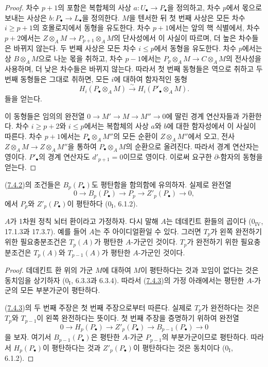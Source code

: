 \begin{proof}
차수 $p+1$의 포함은 복합체의 사상 $a:U_\bullet\to P_\bullet$을
정의하고, 차수 $p$에서 몫으로 보내는 사상은
$b:P_\bullet\to L_\bullet$을 정의한다. $M$을 텐서한 뒤 첫 번째
사상은 모든 차수 $i\geq p+1$의 호몰로지에서 동형을 유도한다.
차수 $p+1$에서는 앞의 핵 식별에서, 차수 $p+2$에서는
$Z\otimes_A M\to P_{p+1}\otimes_A M$의 단사성에서 이 사실이
따르며, 더 높은 차수들은 바뀌지 않는다. 두 번째 사상은 모든 차수
$i\leq p$에서 동형을 유도한다. 차수 $p$에서는 상
$B\otimes_A M$으로 나눈 몫을 취하고, 차수 $p-1$에서는
$P_p\otimes_A M\to C\otimes_A M$의 전사성을 사용하며, 더 낮은
차수들은 바뀌지 않는다. 따라서 첫 번째 동형들은 역으로 취하고 두
번째 동형들은 그대로 취하면, 모든 $i$에 대하여 함자적인 동형
\[
 H_i(P_\bullet\otimes_A M)\xrightarrow{\sim}
 H_i(P'_\bullet\otimes_A M).
\]
들을 얻는다.

이 동형들은 임의의 완전열 $0\to M'\to M\to M''\to0$에 딸린 경계
연산자들과 가환한다. 차수 $i\geq p+2$와 $i\leq p$에서는 복합체의
사상 $a$와 $b$에 대한 함자성에서 이 사실이 따른다. 차수 $p+1$에서는
$P_\bullet\otimes_A M''$의 모든 순환이 $Z\otimes_A M''$에서 오고,
전사 $Z\otimes_A M\to Z\otimes_A M''$을 통하여
$P_\bullet\otimes_A M$의 순환으로 올려진다. 따라서 경계 연산자는
영이다. $P'_\bullet$의 경계 연산자도 $d'_{p+1}=0$이므로 영이다.
이로써 요구한 $\partial$-함자의 동형을 얻는다.
\end{proof}

(\hyperref[III.7.4.2-fr]{7.4.2})의 조건들은 $B_p(P_\bullet)$도
평탄함을 함의함에 유의하자. 실제로 완전열
\[
  0\longrightarrow B_p(P_\bullet)\longrightarrow P_p
  \longrightarrow Z'_p(P_\bullet)\longrightarrow0,
\]
에서 $P_p$와 $Z'_p(P_\bullet)$이 평탄하다 ($0_{\mathrm I}$, 6.1.2).

\begin{corollary}[7.4.3]
\label{III.7.4.3-fr}
$A$가 1차원 정칙 뇌터 환이라고 가정하자. 다시 말해 $A$는 데데킨트
환들의 곱이다 ($0_{\mathrm{IV}}$, 17.1.3과 17.3.7). 예를 들어
$A$는 주 아이디얼환일 수 있다. 그러면 $T_p$가 왼쪽 완전하기 위한
필요충분조건은 $T_p(A)$가 평탄한 $A$-가군인 것이다. $T_p$가
완전하기 위한 필요충분조건은 $T_p(A)$와 $T_{p-1}(A)$가 평탄한
$A$-가군인 것이다.
\end{corollary}

\begin{proof}
데데킨트 환 위의 가군 $M$에 대하여 $M$이 평탄하다는 것과 꼬임이
없다는 것은 동치임을 상기하자 ($0_{\mathrm I}$, 6.3.3과 6.3.4).
따라서 (\hyperref[III.7.4.3-fr]{7.4.3})의 가정 아래에서는 평탄한
$A$-가군의 모든 부분가군이 평탄하다.

(\hyperref[III.7.4.3-fr]{7.4.3})의 두 번째 주장은 첫 번째 주장으로부터
따른다. 실제로 $T_p$가 완전하다는 것은 $T_p$와 $T_{p-1}$이 왼쪽
완전하다는 뜻이다. 첫 번째 주장을 증명하기 위하여 완전열
\[
  0\longrightarrow H_p(P_\bullet)\longrightarrow Z'_p(P_\bullet)
  \longrightarrow B_{p-1}(P_\bullet)\longrightarrow0
\]
을 보자. 여기서 $B_{p-1}(P_\bullet)$은 평탄한 $A$-가군
$P_{p-1}$의 부분가군이므로 평탄하다. 따라서 $H_p(P_\bullet)$이
평탄하다는 것과 $Z'_p(P_\bullet)$이 평탄하다는 것은 동치이다
($0_{\mathrm I}$, 6.1.2).
\end{proof}

